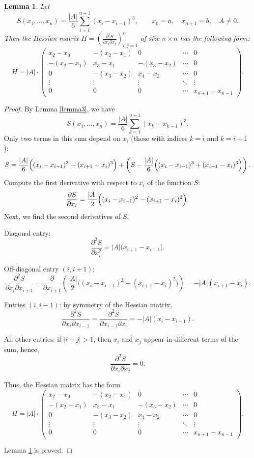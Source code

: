 \documentclass[10pt,a4paper]{amsart}
\newtheorem{lemma}{Lemma}
\begin{document}
\begin{lemma}\label{lemma4}
Let
\[
S(x_1, \dots, x_n) = \frac{|A|}{6} \sum_{i=1}^{n+1} (x_i - x_{i-1})^3, \qquad x_0 = a, \quad x_{n+1} = b, \quad A\neq 0.
\]
Then the Hessian matrix
$
H = \left( \frac{\partial^2 S}{\partial x_i \partial x_j} \right)_{i,j=1}^{n}
$
of size \( n \times n \) has the following form:
\[
H = |A| \cdot
\begin{pmatrix}
x_2 - x_0 & -(x_2 - x_1) & 0 & \cdots & 0 \\
-(x_2 - x_1) & x_3 - x_1 & -(x_3 - x_2) & \cdots & 0 \\
0 & -(x_3 - x_2) & x_4 - x_2 & \cdots & 0 \\
\vdots & \vdots & \vdots & \ddots & \vdots \\
0 & 0 & 0 & \cdots & x_{n+1} - x_{n-1}
\end{pmatrix}.
\]

\end{lemma}

\begin{proof}
By Lemma \ref{lemma3}, we have
\[
S(x_1, \dots, x_n) = \frac{|A|}{6} \sum_{k=1}^{n+1} (x_k - x_{k-1})^3.
\]
Only two terms in this sum depend on \( x_i \) (those with indices \( k = i \) and \( k = i+1 \)):
\[
S = \frac{|A|}{6} \Bigl( (x_i - x_{i-1})^3 + (x_{i+1} - x_i)^3 \Bigr) + \left( S-\frac{|A|}{6} \Bigl( (x_i - x_{i-1})^3 + (x_{i+1} - x_i)^3 \Bigr)\right).
\]
Compute the first derivative with respect to $x_i$ of the function $S$:
\[
\frac{\partial S}{\partial x_i}
= \frac{|A|}{2} \Bigl( (x_i - x_{i-1})^2 - (x_{i+1} - x_i)^2 \Bigr).
\]
Next, we find the second derivatives of $S$.

Diagonal entry:
\[
\frac{\partial^2 S}{\partial x_i^2}
= |A| \bigl(  x_{i+1} - x_{i-1}  \bigr).
\]

Off-diagonal entry \( (i, i+1) \):
\[
\frac{\partial^2 S}{\partial x_i \partial x_{i+1}} = \frac{\partial}{\partial x_{i+1}} \left( \frac{|A|}{2} \bigl( (x_i - x_{i-1})^2 - (x_{i+1} - x_i)^2 \bigr) \right)
= -|A| (x_{i+1} - x_i).
\]

Entries \( (i, i-1) \): by symmetry of the Hessian matrix,
\[
\frac{\partial^2 S}{\partial x_i \partial x_{i-1}} = \frac{\partial^2 S}{\partial x_{i-1} \partial x_i} = -|A| (x_i-x_{i-1}).
\]

All other entries: if \( |i - j| > 1 \), then \( x_i \) and \( x_j \) appear in different terms of the sum, hence,
\[
\frac{\partial^2 S}{\partial x_i \partial x_j} = 0.
\]

Thus, the Hessian matrix has the form
\[
H = |A| \cdot
\begin{pmatrix}
x_2 - x_0 & -(x_2 - x_1) & 0 & \cdots & 0 \\
-(x_2 - x_1) & x_3 - x_1 & -(x_3 - x_2) & \cdots & 0 \\
0 & -(x_3 - x_2) & x_4 - x_2 & \cdots & 0 \\
\vdots & \vdots & \vdots & \ddots & \vdots \\
0 & 0 & 0 & \cdots & x_{n+1} - x_{n-1}
\end{pmatrix}.
\]

Lemma \ref{lemma4} is proved. 
\end{proof}
\end{document}
